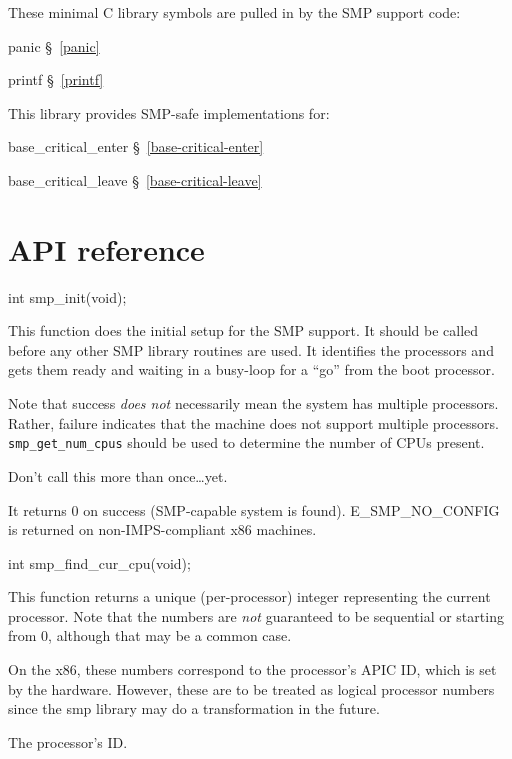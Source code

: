 These minimal C library symbols are pulled in by the SMP support code:
\begin{apidep}
	\item[panic]		\S~\ref{panic}
	\item[printf]		\S~\ref{printf}
\end{apidep}

This library provides SMP-safe implementations for:
\begin{apidep}
	\item[base_critical_enter]	\S~\ref{base-critical-enter}
	\item[base_critical_leave]	\S~\ref{base-critical-leave}
\end{apidep}

\section{API reference}

\begin{apisyn}

        \funcproto int smp_init(void);
\end{apisyn}
\begin{apidesc}
	This function does the initial setup for the SMP support.
	It should be called before any other SMP library routines are
	used.  It identifies the processors and gets them ready
	and waiting in a busy-loop for a ``go'' from the boot
	processor.  

	Note that success \emph{does not} necessarily mean the system
	has multiple processors.  Rather, failure indicates that
	the machine does not support multiple processors.
	{\tt smp_get_num_cpus} should be used to determine the
	number of CPUs present.

	Don't call this more than once\ldots{}yet.
\end{apidesc}
\begin{apiret}
	It returns 0 on success (SMP-capable system is found).
	E_SMP_NO_CONFIG is returned on non-IMPS-compliant x86 machines.
\end{apiret}



\begin{apisyn}

        \funcproto int smp_find_cur_cpu(void);
\end{apisyn}
\begin{apidesc}
	This function returns a unique (per-processor) integer 
	representing the current processor.  Note that the numbers
	are \emph{not} guaranteed to be sequential or starting from 0,
	although that may be a common case.

	On the x86, these numbers correspond to the processor's
	APIC ID, which is set by the hardware.
	However, these are to be treated as logical processor numbers
	since the smp library may do a transformation in the future.
\end{apidesc}
\begin{apiret}
	The processor's ID.
\end{apiret}



